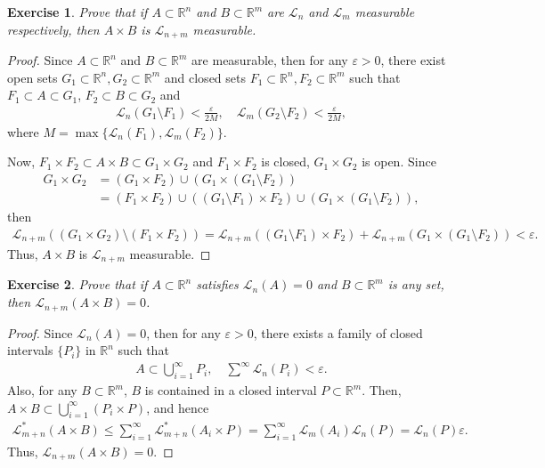 \documentclass[11pt]{book}
\newtheorem{exercise}{Exercise}[chapter]
\theoremstyle{definition}
\numberwithin{equation}{chapter}
\begin{document}
\medskip

\begin{exercise}
Prove that if $A\subset\mathbb{R}^n$ and $B\subset\mathbb{R}^m$ are $\mathcal{L}_n$ and $\mathcal{L}_m$ measurable respectively, then $A\times B$ is $\mathcal{L}_{n+m}$ measurable.
\end{exercise}
\begin{proof}\cite{25}
Since $A\subset\mathbb{R}^n$ and $B\subset\mathbb{R}^m$ are measurable, then for any $\varepsilon > 0$, there exist open sets $G_1 \subset \mathbb{R}^n,G_2 \subset \mathbb{R}^m$ and closed sets $F_1 \subset \mathbb{R}^n,F_2 \subset \mathbb{R}^m$ such that $F_1 \subset A \subset G_1$, $F_2 \subset B \subset G_2$ and
\begin{align*}
    \mathcal{L}_n(G_1\setminus F_1) < \frac{\varepsilon}{2M},\quad \mathcal{L}_m(G_2\setminus F_2) < \frac{\varepsilon}{2M},
\end{align*}
where $M = \max\{\mathcal{L}_n(F_1), \mathcal{L}_m(F_2)\}$. 

Now, $F_1 \times F_2 \subset A \times B \subset G_1 \times G_2$ and $F_1 \times F_2$ is closed, $G_1 \times G_2$ is open. Since
\begin{align*}
    G_1 \times G_2 & = \left(G_1 \times F_2\right) \cup (G_1 \times (G_1 \setminus F_2)) \\
    & = \left(F_1 \times F_2\right) \cup \left((G_1 \setminus F_1) \times F_2\right) \cup (G_1 \times (G_1 \setminus F_2)),
\end{align*}
then 
\begin{align*}
    \mathcal{L}_{n+m}\left((G_1 \times G_2) \setminus (F_1 \times F_2)\right) = \mathcal{L}_{n+m}\left((G_1 \setminus F_1) \times F_2\right) + \mathcal{L}_{n+m} (G_1 \times (G_1 \setminus F_2)) < \varepsilon.
\end{align*}
Thus, $A\times B$ is $\mathcal{L}_{n+m}$ measurable.
\end{proof}

\medskip

\begin{exercise}
Prove that if $A\subset\mathbb{R}^n$ satisfies $\mathcal{L}_n(A)=0$ and $B\subset\mathbb{R}^m$ is any set, then
$\mathcal{L}_{n+m}(A\times B)=0$.
\end{exercise}
\begin{proof}
Since $\mathcal{L}_n(A)=0$, then for any $\varepsilon > 0$, there exists a family of closed intervals $\{P_i\}$ in $\mathbb{R}^n$ such that 
\begin{align*}
    A \subset \bigcup^\infty_{i=1} P_i, \quad \sum^\infty \mathcal{L}_n(P_i) < \varepsilon.
\end{align*}
Also, for any $B \subset \mathbb{R}^m$, $B$ is contained in a closed interval $P \subset \mathbb{R}^m$. Then, $A \times B \subset \bigcup^\infty_{i=1}(P_i \times P)$, and hence
\begin{align*}
    \mathcal{L}^*_{m+n}(A \times B) \leq \sum^\infty_{i=1} \mathcal{L}^*_{m+n}(A_i \times P) = \sum^\infty_{i=1} \mathcal{L}_{m}(A_i) \mathcal{L}_{n}(P) = \mathcal{L}_{n}(P) \varepsilon.
\end{align*}
Thus, $\mathcal{L}_{n+m}(A\times B)=0$.
\end{proof}
\end{document}
